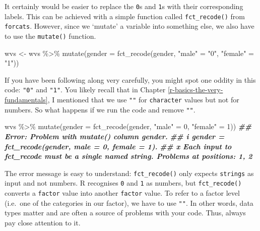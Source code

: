 \documentclass[
]{book}
\newenvironment{Shaded}{\begin{snugshade}}{\end{snugshade}}
\newcommand{\AttributeTok}[1]{\textcolor[rgb]{0.77,0.63,0.00}{#1}}
\newcommand{\DecValTok}[1]{\textcolor[rgb]{0.00,0.00,0.81}{#1}}
\newcommand{\DocumentationTok}[1]{\textcolor[rgb]{0.56,0.35,0.01}{\textbf{\textit{#1}}}}
\newcommand{\FunctionTok}[1]{\textcolor[rgb]{0.00,0.00,0.00}{#1}}
\newcommand{\NormalTok}[1]{#1}
\newcommand{\OtherTok}[1]{\textcolor[rgb]{0.56,0.35,0.01}{#1}}
\newcommand{\SpecialCharTok}[1]{\textcolor[rgb]{0.00,0.00,0.00}{#1}}
\newcommand{\StringTok}[1]{\textcolor[rgb]{0.31,0.60,0.02}{#1}}
\begin{document}
It certainly would be easier to replace the \texttt{0}s and \texttt{1}s with their corresponding labels. This can be achieved with a simple function called \texttt{fct\_recode()} from \texttt{forcats}. However, since we `mutate' a variable into something else, we also have to use the \texttt{mutate()} function.

\begin{Shaded}
\begin{Highlighting}[]
\NormalTok{wvs }\OtherTok{\textless{}{-}}\NormalTok{ wvs }\SpecialCharTok{\%\textgreater{}\%} \FunctionTok{mutate}\NormalTok{(}\AttributeTok{gender =} \FunctionTok{fct\_recode}\NormalTok{(gender, }\StringTok{"male"} \OtherTok{=} \StringTok{"0"}\NormalTok{, }\StringTok{"female"} \OtherTok{=} \StringTok{"1"}\NormalTok{))}
\end{Highlighting}
\end{Shaded}

If you have been following along very carefully, you might spot one oddity in this code: \texttt{"0"} and \texttt{"1"}. You likely recall that in Chapter \ref{r-basics-the-very-fundamentals}, I mentioned that we use \texttt{""} for \texttt{character} values but not for numbers. So what happens if we run the code and remove \texttt{""}.

\begin{Shaded}
\begin{Highlighting}[]
\NormalTok{wvs }\SpecialCharTok{\%\textgreater{}\%} \FunctionTok{mutate}\NormalTok{(}\AttributeTok{gender =} \FunctionTok{fct\_recode}\NormalTok{(gender, }\StringTok{"male"} \OtherTok{=} \DecValTok{0}\NormalTok{, }\StringTok{"female"} \OtherTok{=} \DecValTok{1}\NormalTok{))}
\DocumentationTok{\#\# Error: Problem with \textasciigrave{}mutate()\textasciigrave{} column \textasciigrave{}gender\textasciigrave{}.}
\DocumentationTok{\#\# i \textasciigrave{}gender = fct\_recode(gender, male = 0, female = 1)\textasciigrave{}.}
\DocumentationTok{\#\# x Each input to fct\_recode must be a single named string. Problems at positions: 1, 2}
\end{Highlighting}
\end{Shaded}

The error message is easy to understand: \texttt{fct\_recode()} only expects \texttt{strings} as input and not numbers. R recognises \texttt{0} and \texttt{1} as numbers, but \texttt{fct\_recode()} converts a \texttt{factor} value into another \texttt{factor} value. To refer to a factor level (i.e.~one of the categories in our factor), we have to use \texttt{""}. In other words, data types matter and are often a source of problems with your code. Thus, always pay close attention to it.
\end{document}

